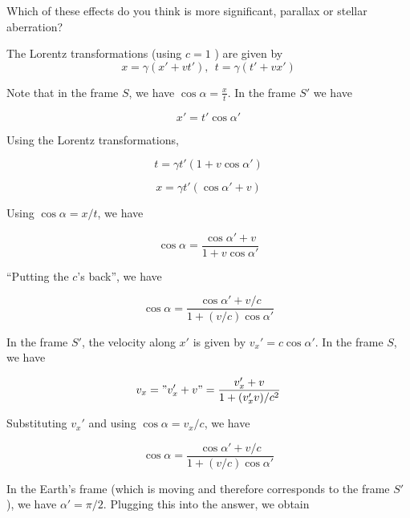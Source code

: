 \documentclass[11pt]{article}
\begin{document}
\begin{pproblem}
\begin{alternativas}
        \item Which of these effects do you think is more significant, parallax or stellar aberration?
    \end{alternativas}

    \begin{pssolution*}{}{}
        \begin{alternativas}
            \item %
            
            \item %
                
            \item The Lorentz transformations (using \(c=1\) ) are given by
            \[x = \gamma (x' + vt'), \ \ t = \gamma(t' + vx')\]

            \item Note that in the frame \(S\), we have \(\cos \alpha = \frac{x}{t}\). In the frame \(S'\) we have
            
            \[x' = t'\cos\alpha'\]

            Using the Lorentz transformations,

            \[t = \gamma t'(1+v\cos\alpha') \]

            \[x = \gamma t'(\cos\alpha'+ v)\]

            Using \(\cos\alpha = x/t\), we have

            \[\cos\alpha = \frac{\cos\alpha' + v}{1+ v\cos\alpha'}\]

            ``Putting the \(c\)'s back'', we have

            \[\boxed{\cos\alpha = \frac{\cos\alpha' + v/c}{1+(v/c)\cos\alpha'}}\]


            \item In the frame \(S'\), the velocity along \(x'\) is given by \(v_x' = c\cos\alpha'\). In the frame \(S\), we have
            
            \[v_x = "v_x'+v" = \frac{v_x'+v}{1+(v_x'v)/c^2}\]

            Substituting \(v_x'\) and using \(\cos\alpha = v_x/c\), we have

            \[\boxed{\cos\alpha =\frac{\cos\alpha' + v/c}{1+(v/c)\cos\alpha'}} \]

            \item In the Earth's frame (which is moving and therefore corresponds to the frame \(S'\)), we have \(\alpha' = \pi/2\). Plugging this into the answer, we obtain
            

\end{alternativas}
\end{pssolution*}
\end{pproblem}
\end{document}
